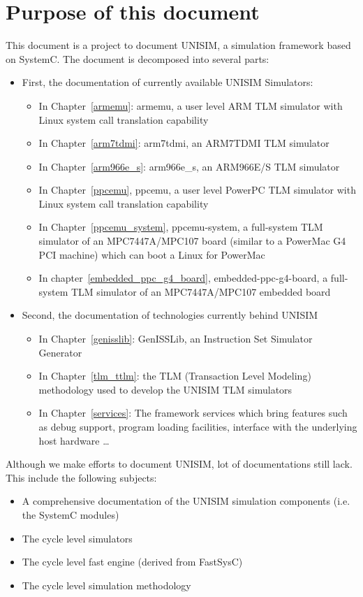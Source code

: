 \section{Purpose of this document}

This document is a project to document UNISIM, a simulation framework based on SystemC.
The document is decomposed into several parts:
\begin{itemize}
	\item First, the documentation of currently available UNISIM Simulators:
	\begin{itemize}
		\item In Chapter~\ref{armemu}: armemu, a user level ARM TLM simulator with Linux system call translation capability
		\item In Chapter~\ref{arm7tdmi}: arm7tdmi, an ARM7TDMI TLM simulator
		\item In Chapter~\ref{arm966e_s}: arm966e\_s, an ARM966E/S TLM simulator
		\item In Chapter~\ref{ppcemu}, ppcemu, a user level PowerPC TLM simulator with Linux system call translation capability
		\item In Chapter~\ref{ppcemu_system}, ppcemu-system, a full-system TLM simulator of an MPC7447A/MPC107 board (similar to a PowerMac G4 PCI machine) which can boot a Linux for PowerMac
		\item In chapter~\ref{embedded_ppc_g4_board}, embedded-ppc-g4-board, a full-system TLM simulator of an MPC7447A/MPC107 embedded board
	\end{itemize}
	\item Second, the documentation of technologies currently behind UNISIM
	\begin{itemize}
		\item In Chapter~\ref{genisslib}: GenISSLib, an Instruction Set Simulator Generator
		\item In Chapter~\ref{tlm_ttlm}: the TLM (Transaction Level Modeling) methodology used to develop the UNISIM TLM simulators
		\item In Chapter~\ref{services}: The framework services which bring features such as debug support, program loading facilities, interface with the underlying host hardware \ldots
	\end{itemize}
\end{itemize}

Although we make efforts to document UNISIM, lot of documentations still lack. This include the following subjects:
\begin{itemize}
	\item A comprehensive documentation of the UNISIM simulation components (i.e. the SystemC modules)
	\item The cycle level simulators
	\item The cycle level fast engine (derived from FastSysC)
	\item The cycle level simulation methodology
\end{itemize}

